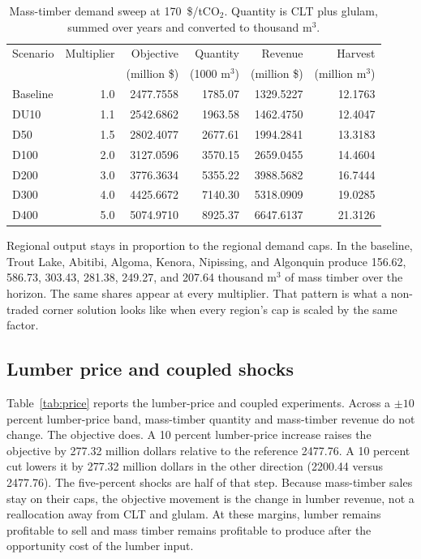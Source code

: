 \documentclass[11pt]{article}
\begin{document}
\begin{table}[ht]
\centering
\caption{Mass-timber demand sweep at 170~\$/tCO$_2$. Quantity is CLT plus glulam, summed over years and converted to thousand m$^3$.}
\label{tab:dem}
\begin{tabular}{lrrrrr}
\toprule
Scenario & Multiplier & Objective & Quantity & Revenue & Harvest \\
 & & (million \$) & (1000 m$^3$) & (million \$) & (million m$^3$) \\
\midrule
Baseline & 1.0 & 2477.7558 & 1785.07 & 1329.5227 & 12.1763 \\
DU10 & 1.1 & 2542.6862 & 1963.58 & 1462.4750 & 12.4047 \\
D50 & 1.5 & 2802.4077 & 2677.61 & 1994.2841 & 13.3183 \\
D100 & 2.0 & 3127.0596 & 3570.15 & 2659.0455 & 14.4604 \\
D200 & 3.0 & 3776.3634 & 5355.22 & 3988.5682 & 16.7444 \\
D300 & 4.0 & 4425.6672 & 7140.30 & 5318.0909 & 19.0285 \\
D400 & 5.0 & 5074.9710 & 8925.37 & 6647.6137 & 21.3126 \\
\bottomrule
\end{tabular}
\end{table}

Regional output stays in proportion to the regional demand caps. In the baseline, Trout Lake, Abitibi, Algoma, Kenora, Nipissing, and Algonquin produce 156.62, 586.73, 303.43, 281.38, 249.27, and 207.64 thousand m$^3$ of mass timber over the horizon. The same shares appear at every multiplier. That pattern is what a non-traded corner solution looks like when every region's cap is scaled by the same factor.

\subsection{Lumber price and coupled shocks}

Table~\ref{tab:price} reports the lumber-price and coupled experiments. Across a $\pm 10$ percent lumber-price band, mass-timber quantity and mass-timber revenue do not change. The objective does. A 10 percent lumber-price increase raises the objective by 277.32 million dollars relative to the reference 2477.76. A 10 percent cut lowers it by 277.32 million dollars in the other direction (2200.44 versus 2477.76). The five-percent shocks are half of that step. Because mass-timber sales stay on their caps, the objective movement is the change in lumber revenue, not a reallocation away from CLT and glulam. At these margins, lumber remains profitable to sell and mass timber remains profitable to produce after the opportunity cost of the lumber input.
\end{document}

